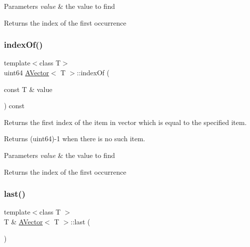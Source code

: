 \begin{DoxyParams}{Parameters}
{\em value} & the value to find \\
\hline
\end{DoxyParams}
\begin{DoxyReturn}{Returns}
the index of the first occurrence 
\end{DoxyReturn}
\mbox{\label{class_a_vector_a81ee68969c55a70a2215e996e2d53027}} 
\subsubsection{\texorpdfstring{indexOf()}{indexOf()}}
{\footnotesize\ttfamily template$<$class T$>$ \\
uint64 \mbox{\hyperlink{class_a_vector}{A\+Vector}}$<$ T $>$\+::index\+Of (\begin{DoxyParamCaption}\item[{const T \&}]{value }\end{DoxyParamCaption}) const}



Returns the first index of the item in vector which is equal to the specified item. 

Returns (uint64)-\/1 when there is no such item.


\begin{DoxyParams}{Parameters}
{\em value} & the value to find \\
\hline
\end{DoxyParams}
\begin{DoxyReturn}{Returns}
the index of the first occurrence 
\end{DoxyReturn}
\mbox{\label{class_a_vector_a0465c474ee53f57eb8817a531ac530b2}} 
\subsubsection{\texorpdfstring{last()}{last()}\hspace{0.1cm}{\footnotesize\ttfamily [1/2]}}
{\footnotesize\ttfamily template$<$class T $>$ \\
T \& \mbox{\hyperlink{class_a_vector}{A\+Vector}}$<$ T $>$\+::last (\begin{DoxyParamCaption}{ }\end{DoxyParamCaption})}



